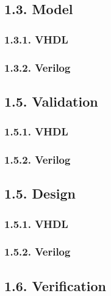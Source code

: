 \documentclass[
]{article}
\begin{document}
\hypertarget{model}{%
\subsection{1.3. Model}\label{model}}

\hypertarget{vhdl}{%
\subsubsection{1.3.1. VHDL}\label{vhdl}}

\hypertarget{verilog}{%
\subsubsection{1.3.2. Verilog}\label{verilog}}

\hypertarget{validation}{%
\subsection{1.5. Validation}\label{validation}}

\hypertarget{vhdl-1}{%
\subsubsection{1.5.1. VHDL}\label{vhdl-1}}

\hypertarget{verilog-1}{%
\subsubsection{1.5.2. Verilog}\label{verilog-1}}

\hypertarget{design}{%
\subsection{1.5. Design}\label{design}}

\hypertarget{vhdl-2}{%
\subsubsection{1.5.1. VHDL}\label{vhdl-2}}

\hypertarget{verilog-2}{%
\subsubsection{1.5.2. Verilog}\label{verilog-2}}

\hypertarget{verification}{%
\subsection{1.6. Verification}\label{verification}}
\end{document}
